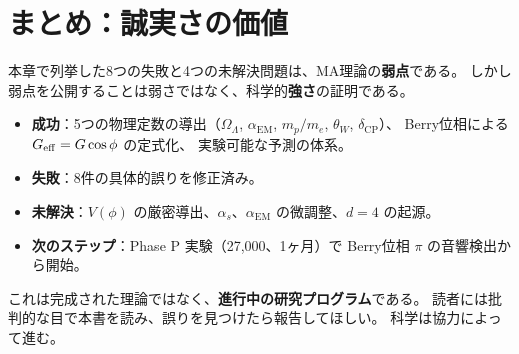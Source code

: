 \section{まとめ：誠実さの価値}
\label{sec:18.3}

本章で列挙した8つの失敗と4つの未解決問題は、MA理論の\textbf{弱点}である。
しかし弱点を公開することは弱さではなく、科学的\textbf{強さ}の証明である。

\begin{keyresult}[MA理論の現在地]
\begin{itemize}
  \item \textbf{成功}：5つの物理定数の導出（$\Omega_\Lambda$, $\alpha_{\mathrm{EM}}$, $m_p/m_e$, $\theta_W$, $\delta_{\mathrm{CP}}$）、
        Berry位相による $G_{\mathrm{eff}} = G\cos\phi$ の定式化、
        実験可能な予測の体系。
  \item \textbf{失敗}：8件の具体的誤りを修正済み。
  \item \textbf{未解決}：$V(\phi)$ の厳密導出、$\alpha_s$、$\alpha_{\mathrm{EM}}$ の微調整、$d = 4$ の起源。
  \item \textbf{次のステップ}：Phase P 実験（{\yen}27,000、1ヶ月）で
        Berry位相 $\pi$ の音響検出から開始。
\end{itemize}

これは完成された理論ではなく、\textbf{進行中の研究プログラム}である。
読者には批判的な目で本書を読み、誤りを見つけたら報告してほしい。
科学は協力によって進む。
\end{keyresult}
